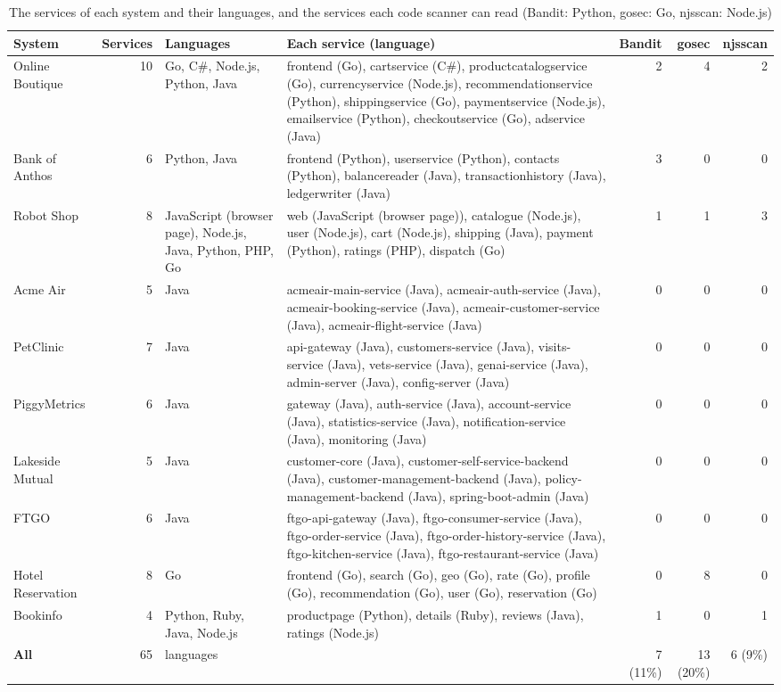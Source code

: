 \documentclass[conference]{IEEEtran}
\begin{document}
\begin{table}[!t]
\caption{The services of each system and their languages, and the services each code scanner can read (Bandit: Python, gosec: Go, njsscan: Node.js)}
\label{tab:syslangs}
\centering
\scriptsize
\setlength{\tabcolsep}{3pt}
\begin{tabular}{@{}lr>{\raggedright\arraybackslash}p{2.5cm}>{\raggedright\arraybackslash}p{8.4cm}rrr@{}}
\toprule
System & Services & Languages & Each service (language) & Bandit & gosec & njsscan \\
\midrule
Online Boutique & 10 & Go, C\#, Node.js, Python, Java & frontend (Go), cartservice (C\#), productcatalogservice (Go), currencyservice (Node.js), recommendationservice (Python), shippingservice (Go), paymentservice (Node.js), emailservice (Python), checkoutservice (Go), adservice (Java) & 2 & 4 & 2 \\
Bank of Anthos & 6 & Python, Java & frontend (Python), userservice (Python), contacts (Python), balancereader (Java), transactionhistory (Java), ledgerwriter (Java) & 3 & 0 & 0 \\
Robot Shop & 8 & JavaScript (browser page), Node.js, Java, Python, PHP, Go & web (JavaScript (browser page)), catalogue (Node.js), user (Node.js), cart (Node.js), shipping (Java), payment (Python), ratings (PHP), dispatch (Go) & 1 & 1 & 3 \\
Acme Air & 5 & Java & acmeair-main-service (Java), acmeair-auth-service (Java), acmeair-booking-service (Java), acmeair-customer-service (Java), acmeair-flight-service (Java) & 0 & 0 & 0 \\
PetClinic & 7 & Java & api-gateway (Java), customers-service (Java), visits-service (Java), vets-service (Java), genai-service (Java), admin-server (Java), config-server (Java) & 0 & 0 & 0 \\
PiggyMetrics & 6 & Java & gateway (Java), auth-service (Java), account-service (Java), statistics-service (Java), notification-service (Java), monitoring (Java) & 0 & 0 & 0 \\
Lakeside Mutual & 5 & Java & customer-core (Java), customer-self-service-backend (Java), customer-management-backend (Java), policy-management-backend (Java), spring-boot-admin (Java) & 0 & 0 & 0 \\
FTGO & 6 & Java & ftgo-api-gateway (Java), ftgo-consumer-service (Java), ftgo-order-service (Java), ftgo-order-history-service (Java), ftgo-kitchen-service (Java), ftgo-restaurant-service (Java) & 0 & 0 & 0 \\
Hotel Reservation & 8 & Go & frontend (Go), search (Go), geo (Go), rate (Go), profile (Go), recommendation (Go), user (Go), reservation (Go) & 0 & 8 & 0 \\
Bookinfo & 4 & Python, Ruby, Java, Node.js & productpage (Python), details (Ruby), reviews (Java), ratings (Node.js) & 1 & 0 & 1 \\
\textbf{All} & 65 & 8 languages &  & 7 (11\%) & 13 (20\%) & 6 (9\%) \\
\bottomrule
\end{tabular}
\end{table}
\end{document}
